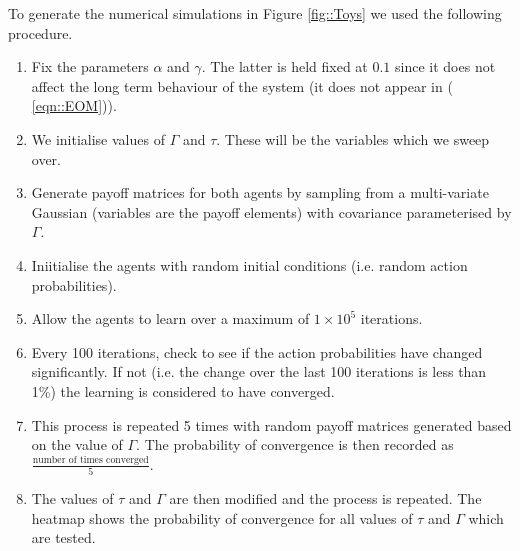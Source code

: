 \documentclass[.../main.tex]{subfiles}
\begin{document}
To generate the numerical simulations in Figure \ref{fig::Toys} we used the following procedure.

\begin{enumerate}
	\item Fix the parameters $\alpha$ and $\gamma$. The latter is held fixed at $0.1$ since
	it does not affect the long term behaviour of the system (it does not appear in (
	\ref{eqn::EOM})).
	\item We initialise values of $\Gamma$ and $\tau$. These will be the variables which we sweep
	over.
	\item Generate payoff matrices for both agents by sampling from a multi-variate Gaussian 
	(variables are the payoff elements) with covariance parameterised by $\Gamma$.
	\item Iniitialise the agents with random initial conditions (i.e. random action probabilities).
	\item Allow the agents to learn over a maximum of $1 \times 10^5$ iterations.
	\item Every 100 iterations, check to see if the action probabilities have changed significantly.
	If not (i.e. the change over the last 100 iterations is less than 1\%) the learning is
	considered to have converged.
	\item This process is repeated 5 times with random payoff matrices generated based on the value
	of $\Gamma$. The probability of convergence is then recorded as $\frac{\text{number of times
	converged}}{5}$.
	\item The values of $\tau$ and $\Gamma$ are then modified and the process is repeated. The
	heatmap shows the probability of convergence for all values of $\tau$ and $\Gamma$ which are
	tested.
\end{enumerate}
\end{document}
